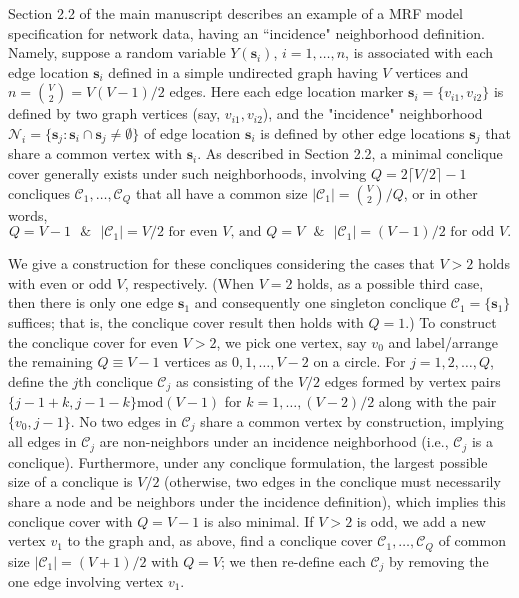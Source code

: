 \documentclass[12pt]{article}
\theoremstyle{definition}
\begin{document}
Section 2.2 of the main manuscript describes an example of a MRF model specification for network data, having an ``incidence" neighborhood definition.  Namely, suppose a random variable $Y(\boldsymbol{s}_i)$, $i=1,\ldots,n$, is associated with each edge location $\boldsymbol{s}_i$ defined in a simple undirected graph having $V$ vertices and $n = {V \choose 2}=V(V-1)/2$ edges.  Here each edge location marker $\boldsymbol{s}_i = \{v_{i1},v_{i2}\}$ is defined by two graph vertices (say, $v_{i1},v_{i2}$), and the "incidence" neighborhood 
$\mathcal{N}_i = \{\boldsymbol{s}_j : \boldsymbol{s}_i \cap \boldsymbol{s}_j \neq \emptyset\}$ of edge location $\boldsymbol{s}_i$ is defined by other edge locations $\boldsymbol{s}_j$ that share a common vertex with $\boldsymbol{s}_i$.  As described in Section 2.2, a minimal conclique cover generally exists under such neighborhoods, involving $Q = 2 \lceil V/2 \rceil -1$ concliques $\mathcal{C}_1,\ldots,\mathcal{C}_Q$ that all have a common size $|\mathcal{C}_1| = {V \choose 2}/Q$, or in other words,
$$
Q=V-1  \text{ }\&\text{ } |\mathcal{C}_1|= V/2 \text{ for even } V\text{, and } Q=V  \text{ }\&\text{ } |\mathcal{C}_1|=(V-1)/2 \text{ for odd } V.
$$

We give a construction for these concliques considering the cases that $V>2$ holds with even or odd $V$, respectively.  (When $V=2$ holds, as a possible third case, then there is only one edge $\boldsymbol{s}_1$ and consequently one singleton conclique $\mathcal{C}_1=\{\boldsymbol{s}_1\}$ suffices; that is, the conclique cover result then holds with $Q=1$.)  To construct the conclique cover for even $V>2$, we pick one vertex, say $v_0$ and label/arrange the remaining $Q\equiv V-1$ vertices as $0,1,\ldots,V-2$ on a circle. For $j=1,2,\ldots,Q$, define the $j$th conclique $\mathcal{C}_{j}$ as consisting of the $V/2$ edges formed by  vertex pairs $\{j-1+k,j-1-k\}\mathrm{mod} (V-1)$ for $k=1,\ldots, (V-2)/2$ along with the pair $\{v_0, j-1\}$. No two edges in $\mathcal{C}_j$ share a common vertex by construction, implying all edges in $\mathcal{C}_j$ are non-neighbors under an incidence neighborhood (i.e., $\mathcal{C}_j$ is a conclique). Furthermore, under any conclique formulation, the largest possible size of a conclique  is $V/2$  (otherwise, two edges in the conclique must necessarily share a node and be neighbors under the incidence definition), which implies this conclique cover  with $Q=V-1$ is also minimal. If $V>2$ is odd, we add a new vertex  $v_1$ to the graph and, as above, find a conclique cover $\mathcal{C}_1,\ldots,\mathcal{C}_Q$ of common size $|\mathcal{C}_1| = (V+1)/2$ with $Q=V$; we then re-define each $\mathcal{C}_j$ by removing the one edge involving vertex $v_1$.
\end{document}
